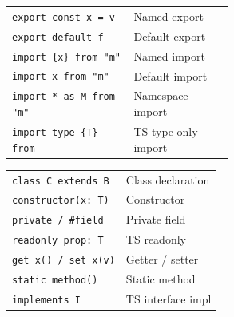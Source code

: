 \documentclass[10pt]{extarticle}
\begin{document}
\begin{multicols}{2}
\begin{tabularx}{\linewidth}{@{}>{\raggedright\arraybackslash}p{0.55\linewidth}@{\enspace}Y@{}}
\texttt{export const x = v}         & Named export \\
\texttt{export default f}           & Default export \\
\texttt{import \{x\} from "m"}     & Named import \\
\texttt{import x from "m"}          & Default import \\
\texttt{import * as M from "m"}    & Namespace import \\
\texttt{import type \{T\} from}    & TS type-only import \\
\end{tabularx}

\begin{tabularx}{\linewidth}{@{}l@{\enspace}Y@{}}
\texttt{class C extends B}          & Class declaration \\
\texttt{constructor(x: T)}          & Constructor \\
\texttt{private / \#field}          & Private field \\
\texttt{readonly prop: T}           & TS readonly \\
\texttt{get x() / set x(v)}        & Getter / setter \\
\texttt{static method()}            & Static method \\
\texttt{implements I}               & TS interface impl \\
\end{tabularx}

\end{multicols}

\newpage

\end{document}

